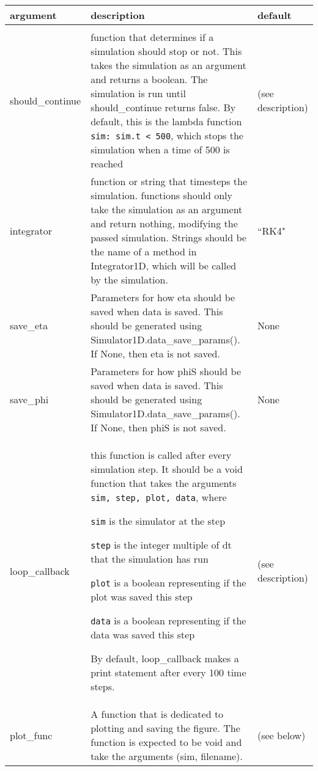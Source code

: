 \documentclass[10pt,a4paper]{article}
\newenvironment{optarglist}
    {\begin{center}
    \begin{tabular}{l|p{10cm}|l}
    argument & description & default\\
    \hline\\
    }
    { 
    \end{tabular} 
    \end{center}
    }
\begin{document}
\begin{optarglist}
should\_continue &
                   function that determines if a simulation should stop or
                    not. This takes the simulation as an argument and returns a
                    boolean. The simulation is run until should\_continue
                    returns false. By default, this is the lambda function
                    \texttt{sim: sim.t < 500}, which stops the simulation when a time of 500 is reached & (see description)\\\hline
integrator &
function or string that timesteps the simulation.
                    functions should only take the simulation as an argument
                    and return nothing, modifying the passed simulation.
                    Strings should be the name of a method in Integrator1D,
                    which will be called by the simulation. &
                    ``RK4" \\\hline

save\_eta &
                   Parameters for how eta should be saved when data is saved.
                    This should be generated using
                    Simulator1D.data\_save\_params(). If None, then eta is not
                    saved. & None\\\hline
        
        save\_phi &
                   Parameters for how phiS should be saved when data is saved.
                    This should be generated using
                    Simulator1D.data\_save\_params(). If None, then phiS is not
                    saved. & None\\\hline

        loop\_callback &
                   this function is called after every simulation step. It
                    should be a void function that takes the arguments
                    \texttt{sim, step, plot, data}, where

                    \texttt{sim} is the simulator at the step

                    \texttt{step} is the integer multiple of dt that the simulation
                    has run

                    \texttt{plot} is a boolean representing if the plot was saved this
                    step

                    \texttt{data} is a boolean representing if the data was saved this
                    step
                    
                    By default, loop\_callback makes a print statement after
                    every 100 time steps. & (see description)\\\hline
        plot\_func &
                   A function that is dedicated to plotting and saving the
                    figure. The function is expected to be void and take the
                    arguments (sim, filename). & (see below)
\end{optarglist}
\end{document}
